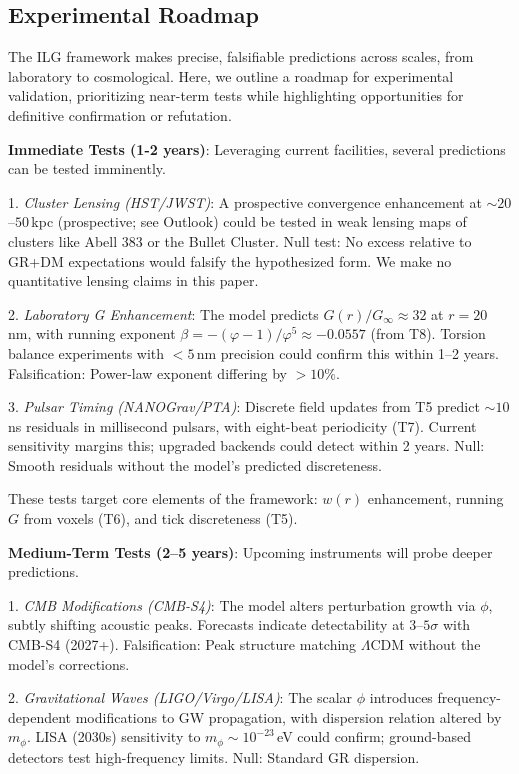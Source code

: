 \documentclass[12pt,a4paper]{article}
\begin{document}
\subsection{Experimental Roadmap}

The ILG framework makes precise, falsifiable predictions across scales, from laboratory to cosmological. Here, we outline a roadmap for experimental validation, prioritizing near-term tests while highlighting opportunities for definitive confirmation or refutation.

\textbf{Immediate Tests (1-2 years)}: Leveraging current facilities, several predictions can be tested imminently.

1. \emph{Cluster Lensing (HST/JWST)}: A prospective convergence enhancement at $\sim 20$--$50$\,kpc (prospective; see Outlook) could be tested in weak lensing maps of clusters like Abell 383 or the Bullet Cluster. Null test: No excess relative to GR+DM expectations would falsify the hypothesized form. We make no quantitative lensing claims in this paper.

2. \emph{Laboratory G Enhancement}: The model predicts $G(r)/G_\infty \approx 32$ at $r=20$\,nm, with running exponent $\beta = -(\varphi-1)/\varphi^5 \approx -0.0557$ (from T8). Torsion balance experiments with $<5$\,nm precision could confirm this within 1--2 years. Falsification: Power-law exponent differing by $>10\%$.

3. \emph{Pulsar Timing (NANOGrav/PTA)}: Discrete field updates from T5 predict $\sim 10$\,ns residuals in millisecond pulsars, with eight-beat periodicity (T7). Current sensitivity margins this; upgraded backends could detect within 2 years. Null: Smooth residuals without the model's predicted discreteness.

These tests target core elements of the framework: $w(r)$ enhancement, running $G$ from voxels (T6), and tick discreteness (T5).

\textbf{Medium-Term Tests (2--5 years)}: Upcoming instruments will probe deeper predictions.

1. \emph{CMB Modifications (CMB-S4)}: The model alters perturbation growth via $\phi$, subtly shifting acoustic peaks. Forecasts indicate detectability at $3$--$5\sigma$ with CMB-S4 (2027+). Falsification: Peak structure matching $\Lambda$CDM without the model's corrections.

2. \emph{Gravitational Waves (LIGO/Virgo/LISA)}: The scalar $\phi$ introduces frequency-dependent modifications to GW propagation, with dispersion relation altered by $m_\phi$. LISA (2030s) sensitivity to $m_\phi \sim 10^{-23}$\,eV could confirm; ground-based detectors test high-frequency limits. Null: Standard GR dispersion.
\end{document}
